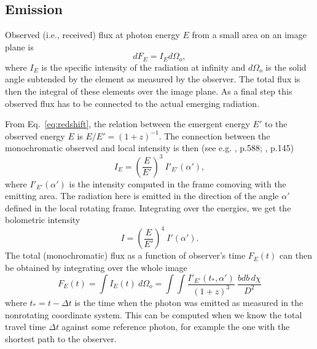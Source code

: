 \documentclass{aa}
\newcommand{\be}{\begin{equation}}
\newcommand{\ee}{\end{equation}}
\newcommand{\red}[1]{\textcolor{red}{#1}}
\newcommand{\refe}[1]{#1}
\newcommand{\refedel}[1]{}
\begin{document}


\subsection{Emission}\label{sect:emission}
Observed (i.e., received) flux at photon energy $E$ from a small area on an image plane is
\be
dF_E = I_E d\Omega_o,
\ee
where $I_E$ is the specific intensity of the radiation at infinity and $d\Omega_o$ is the solid angle subtended by the element as measured by the observer. 
The total flux is then the integral of these elements over the image plane.
As a final step this observed flux has to be connected to the actual emerging radiation.

From Eq.~\eqref{eq:redshift}, the relation between the emergent energy $E'$ to the observed energy $E$ is $E/E' = (1 + z)^{-1}$.
The connection between the monochromatic observed and local intensity is then (see e.g. \citealt{MTW73}, p.588; \citealt{RL79}, p.145)
\be
I_E = \left( \frac{E}{E'} \right)^3 ~I'_{E'}(\alpha'),
\ee
where $I'_{E'}(\alpha')$ is the intensity computed in the frame comoving with the emitting area.
The radiation here is emitted in the direction of the angle $\alpha'$ defined in the local rotating frame.
Integrating over the energies, we get the bolometric intensity
\be
I = \left(\frac{E}{E'} \right)^4 ~I'(\alpha').
\ee
The total (monochromatic) flux as a function of observer's time $F_E(t)$ can then be obtained by integrating over the whole image
\be\label{eq:fluxint}
F_E(t) = \int I_{E}(t) ~d\Omega_o = \int\int \frac{I'_{E'}(t_*, \alpha')}{(1+z)^3}  ~\frac{bdb \, d\chi}{D^2}
\ee
where $t_* = t - \Delta t$ is the time when the photon was \refe{emitted as measured in the nonrotating coordinate system.}
This can be computed when we know the total travel time $\Delta t$ against some reference photon, for example the one with the shortest path to the observer.
\end{document}
